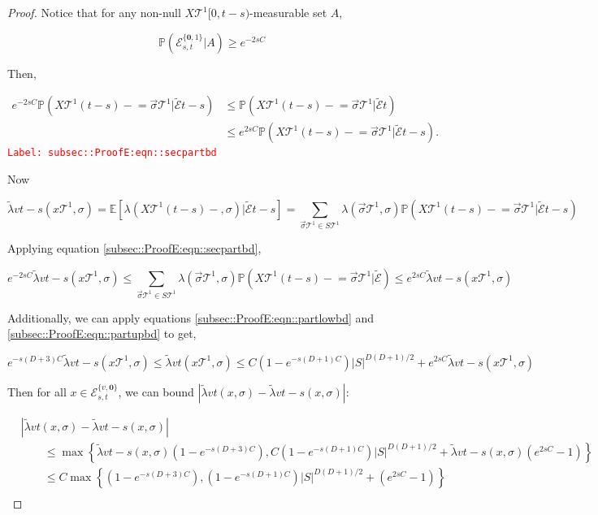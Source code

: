 \documentclass[12pt]{article}
\newcommand{\mb}{\mathbb}
\newcommand{\mc}{\mathcal}
\newcommand{\tr}{\textcolor{red}}
\newcommand{\labe}[1]{\tr{\texttt{Label: #1}}}
\newcommand{\pr}{\mb{P}}							%
\newcommand{\ex}[1]{\mb{E}\left[#1\right]}			%
\renewcommand{\root}{\mathbf{0}}				%
\renewcommand{\v}{v}							%
\renewcommand{\S}{S}							%
\newcommand{\s}{\sigma}							%
\newcommand{\sv}{\vec{\s}}						%
\newcommand{\x}{x}								%
\renewcommand{\t}{t}							%
\renewcommand{\tt}{s}							%
\newcommand{\X}{X}								%
\newcommand{\const}{C}							%
\newcommand{\degr}{D}							%
\newcommand{\tree}{\mc{T}}						%
\newcommand{\sln}[1]{^{#1}}						%
\newcommand{\rate}{\lambda}						%
\newcommand{\alt}[1]{\widetilde{#1}}			%
\newcommand{\evnt}{\mc{E}}						%
\newcommand{\typset}{A}							%
\newcommand{\crate}{\alt{\lambda}}				%
\begin{document}
\begin{proof}
Notice that for any non-null \(\X{\tree\sln{1}}{[0,\t-\tt)}\)-measurable set \(\typset\), 

\[\pr(\evnt{}^{\{\root,1\}}_{\tt,\t}|\typset) \geq e^{-2\tt\const{}}\]

Then,

\begin{align}
e^{-2\tt\const{}}\pr\left(\X{\tree\sln{1}}{(\t-\tt)-}=\sv{}{\tree\sln{1}}|\alt{\evnt}{\t-\tt}\right) &\leq \pr\left(\X{\tree\sln{1}}{(\t-\tt)-}=\sv{}{\tree\sln{1}}|\alt{\evnt}{\t}\right)\nonumber\\
&\leq e^{2\tt\const{}}\pr\left(\X{\tree\sln{1}}{(\t-\tt)-}=\sv{}{\tree\sln{1}}|\alt{\evnt}{\t-\tt}\right).
\label{subsec::ProofE:eqn::secpartbd}
\end{align}
\labe{subsec::ProofE:eqn::secpartbd}

Now

\[\crate{\v}{\t-\tt}(\x{\tree\sln{1}}{},\s) = \ex{\rate{}(\X{\tree\sln{1}}{(\t-\tt)-},\s)|\alt{\evnt}{\t-\tt}} = \sum_{\sv{}{\tree\sln{1}}\in \S{\tree\sln{1}}}\rate{}(\sv{}{\tree\sln{1}},\s)\pr\left(\X{\tree\sln{1}}{(\t-\tt)-} = \sv{}{\tree\sln{1}}|\alt{\evnt}{\t-\tt}\right)\]

Applying equation \eqref{subsec::ProofE:eqn::secpartbd},

\[e^{-2\tt\const{}}\crate{\v}{\t-\tt}(\x{\tree\sln{1}}{},\s) \leq \sum_{\sv{}{\tree\sln{1}}\in \S{\tree\sln{1}}} \lambda(\sv{}{\tree\sln{1}},\s)\pr(\X{\tree\sln{1}}{(\t-\tt)-} = \sv{}{\tree\sln{1}}|\alt{\evnt}{	})\leq e^{2\tt\const{}}\crate{\v}{\t-\tt}(\x{\tree\sln{1}}{},\s)\]

Additionally, we can apply equations \eqref{subsec::ProofE:eqn::partlowbd} and  \eqref{subsec::ProofE:eqn::partupbd} to get,

\[e^{-\tt(\degr+3)\const{}}\crate{\v}{\t-\tt}(\x{\tree\sln{1}}{},\s) \leq \crate{\v}{\t}(\x{\tree\sln{1}}{},\s) \leq \const{}(1 - e^{-\tt(\degr+1)\const{}})|\S|^{\degr(\degr+1)/2} + e^{2\tt\const{}}\crate{\v}{\t-\tt}(\x{\tree\sln{1}}{},\s)\]

Then for all \(\x{}{} \in \evnt{}^{\{\v,\root\}}_{\tt,\t}\), we can bound \(|\crate{\v}{\t}(\x{}{},\s) - \crate{\v}{\t-\tt}(\x{}{},\s)|\):

\begin{align*}
&|\crate{\v}{\t}(\x{}{},\s) - \crate{\v}{\t-\tt}(\x{}{},\s)| \\
&\hspace{24pt}\leq \max\left\{\crate{\v}{\t-\tt}(\x{}{},\s)\left(1 - e^{-\tt(\degr+3)\const{}}\right),\const{}(1-e^{-\tt(\degr+1)\const{}})|\S|^{\degr(\degr+1)/2} + \crate{\v}{\t-\tt}(\x{}{},\s)\left(e^{2\tt\const{}} - 1\right)\right\}\\
&\hspace{24pt}\leq \const{}\max\left\{\left(1 - e^{-\tt(\degr+3)\const{}}\right),(1-e^{-\tt(\degr+1)\const{}})|\S|^{\degr(\degr+1)/2} + \left(e^{2\tt\const{}} - 1\right)\right\}\\
\end{align*}


\end{proof}
\end{document}
